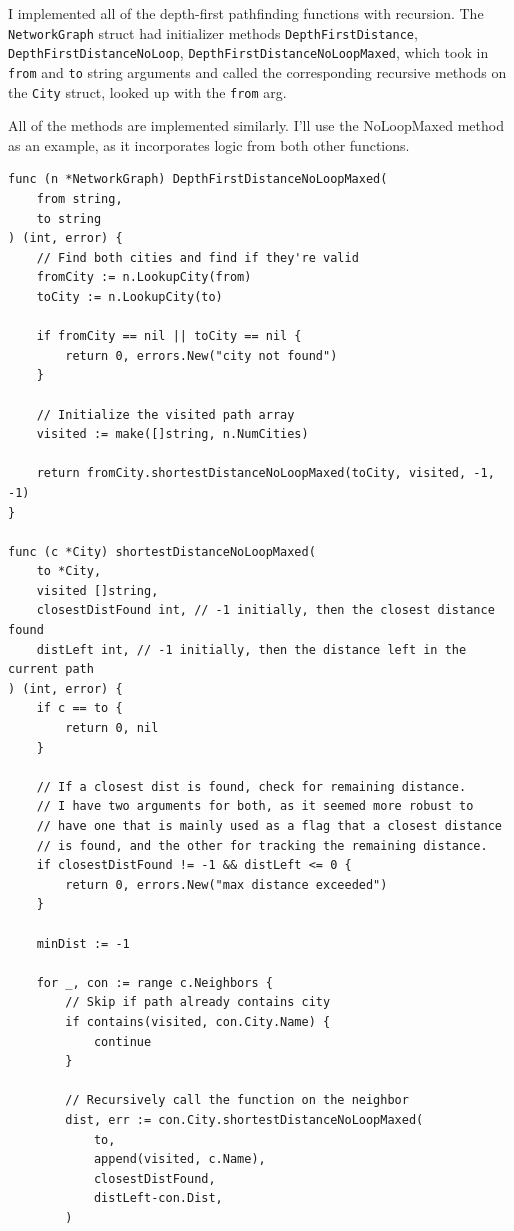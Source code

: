 \documentclass[a4paper,11pt]{article}
\begin{document}
    I implemented all of the depth-first pathfinding functions with recursion. The \texttt{NetworkGraph} struct had initializer methods \texttt{DepthFirstDistance}, \texttt{DepthFirstDistanceNoLoop}, \texttt{DepthFirstDistanceNoLoopMaxed}, which took in \texttt{from} and \texttt{to} string arguments and called the corresponding recursive methods on the \texttt{City} struct, looked up with the \texttt{from} arg.

    All of the methods are implemented similarly. I'll use the NoLoopMaxed method as an example, as it incorporates logic from both other functions.

    \begin{verbatim}
func (n *NetworkGraph) DepthFirstDistanceNoLoopMaxed(
    from string,
    to string
) (int, error) {
    // Find both cities and find if they're valid
    fromCity := n.LookupCity(from)
    toCity := n.LookupCity(to)

    if fromCity == nil || toCity == nil {
        return 0, errors.New("city not found")
    }

    // Initialize the visited path array
    visited := make([]string, n.NumCities)

    return fromCity.shortestDistanceNoLoopMaxed(toCity, visited, -1, -1)
}

func (c *City) shortestDistanceNoLoopMaxed(
    to *City,
    visited []string,
    closestDistFound int, // -1 initially, then the closest distance found
    distLeft int, // -1 initially, then the distance left in the current path
) (int, error) {
    if c == to {
        return 0, nil
    }

    // If a closest dist is found, check for remaining distance.
    // I have two arguments for both, as it seemed more robust to
    // have one that is mainly used as a flag that a closest distance
    // is found, and the other for tracking the remaining distance.
    if closestDistFound != -1 && distLeft <= 0 {
        return 0, errors.New("max distance exceeded")
    }

    minDist := -1

    for _, con := range c.Neighbors {
        // Skip if path already contains city
        if contains(visited, con.City.Name) {
            continue
        }

        // Recursively call the function on the neighbor
        dist, err := con.City.shortestDistanceNoLoopMaxed(
            to,
            append(visited, c.Name),
            closestDistFound,
            distLeft-con.Dist,
        )


\end{verbatim}
\end{document}
